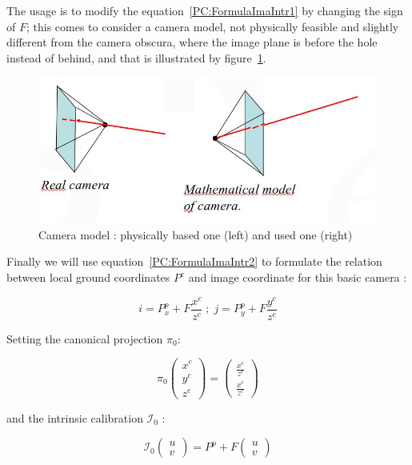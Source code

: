 The usage is to modify the equation~\ref{PC:FormulaImaIntr1} by changing the sign of $F$;
this comes to consider a camera model,
 not physically feasible and slightly different from the camera obscura,  
where the image plane is before the hole instead of behind, and that
is illustrated by figure~\ref{fig:PcInvCam}.  

\begin{figure}
\centering
\includegraphics[width=12cm]{Methods/Images/InvCamera.jpg}
	\caption{Camera model : physically based one (left) and used one (right)}
	\label{fig:PcInvCam}
\end{figure}

Finally we will use equation~\ref{PC:FormulaImaIntr2} to formulate the relation between
local ground coordinates $P^c$  and image coordinate for this basic camera :

\begin{equation}
	i = P^p_x +F \frac{x^c}{z^c}  \; ; \;
	j = P^p_y +F \frac{y^c}{z^c}  
	\label{PC:FormulaImaIntr2}
\end{equation}

Setting the canonical projection $\pi_0$:

\begin{equation}
	  \pi_0 \begin{pmatrix} x^c \\ y^c \\ z^c \end{pmatrix} 
           =  \begin{pmatrix} \frac{x^c}{z^c} \\  \frac{x^c}{z^c}  \end{pmatrix} 
\end{equation}

and the intrinsic calibration $ \mathcal{I}_0$ :

\begin{equation}
	   \mathcal{I}_0  \begin{pmatrix} u \\  v  \end{pmatrix} 
		   =  P^p + F  \begin{pmatrix} u \\  v  \end{pmatrix}  \label{EqIntNoDist}
\end{equation}

